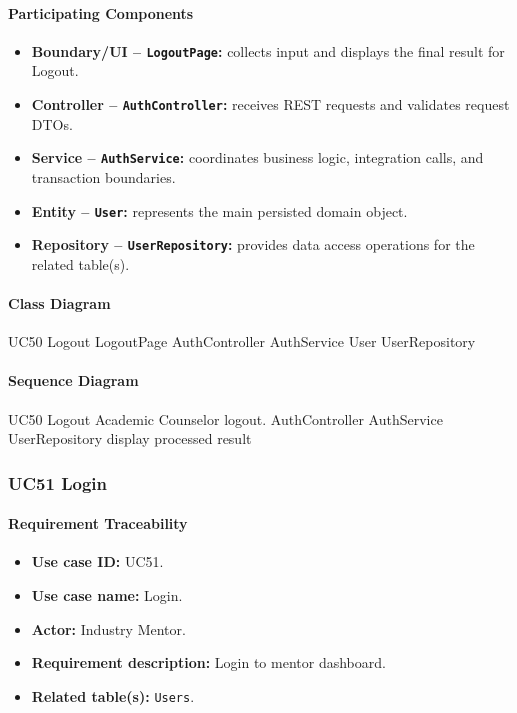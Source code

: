 \paragraph{Participating Components}

\begin{itemize}
    \item \textbf{Boundary/UI -- \texttt{LogoutPage}:} collects input and displays the final result for Logout.
    \item \textbf{Controller -- \texttt{AuthController}:} receives REST requests and validates request DTOs.
    \item \textbf{Service -- \texttt{AuthService}:} coordinates business logic, integration calls, and transaction boundaries.
    \item \textbf{Entity -- \texttt{User}:} represents the main persisted domain object.
    \item \textbf{Repository -- \texttt{UserRepository}:} provides data access operations for the related table(s).
\end{itemize}

\paragraph{Class Diagram}

\ClassDiagram
{UC50 Logout}
{LogoutPage}
{AuthController}
{AuthService}
{User}
{UserRepository}

\paragraph{Sequence Diagram}

\SequenceDiagram
{UC50 Logout}
{Academic Counselor}
{logout.}
{AuthController}
{AuthService}
{UserRepository}
{display processed result}

\subsubsection{UC51 Login}

\paragraph{Requirement Traceability}

\begin{itemize}
    \item \textbf{Use case ID:} UC51.
    \item \textbf{Use case name:} Login.
    \item \textbf{Actor:} Industry Mentor.
    \item \textbf{Requirement description:} Login to mentor dashboard.
    \item \textbf{Related table(s):} \texttt{Users}.
\end{itemize}

